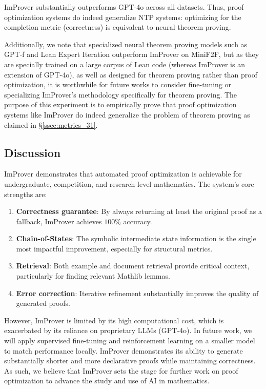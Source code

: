 ImProver substantially outperforms GPT-4o across all datasets. Thus, proof optimization systems do indeed generalize NTP systems: optimizing for the completion metric (correctness) is equivalent to neural theorem proving.

Additionally, we note that specialized neural theorem proving models such as GPT-f \cite{zheng2022miniff} and Lean Expert Iteration \cite{DBLP:journals/corr/abs-2202-01344} outperform ImProver on MiniF2F, but as they are specially trained on a large corpus of Lean code (whereas ImProver is an extension of GPT-4o), as well as designed for theorem proving rather than proof optimization, it is worthwhile for future works to consider fine-tuning or specializing ImProver's methodology specifically for theorem proving. The purpose of this experiment is to empirically prove that proof optimization systems like ImProver do indeed generalize the problem of theorem proving as claimed in \S\ref{ssec:metrics_31}.

\subsection{Discussion}
\label{sec:improver_discussion}

ImProver demonstrates that automated proof optimization is achievable for undergraduate, competition, and research-level mathematics. The system's core strengths are:

\begin{enumerate}
    \item \textbf{Correctness guarantee}: By always returning at least the original proof as a fallback, ImProver achieves $100\%$ accuracy.
    \item \textbf{Chain-of-States}: The symbolic intermediate state information is the single most impactful improvement, especially for structural metrics.
    \item \textbf{Retrieval}: Both example and document retrieval provide critical context, particularly for finding relevant Mathlib lemmas.
    \item \textbf{Error correction}: Iterative refinement substantially improves the quality of generated proofs.
\end{enumerate}

However, ImProver is limited by its high computational cost, which is exacerbated by its reliance on proprietary LLMs (GPT-4o). In future work, we will apply supervised fine-tuning and reinforcement learning on a smaller model to match performance locally. ImProver demonstrates its ability to generate substantially shorter and more declarative proofs while maintaining correctness. As such, we believe that ImProver sets the stage for further work on proof optimization to advance the study and use of AI in mathematics.
